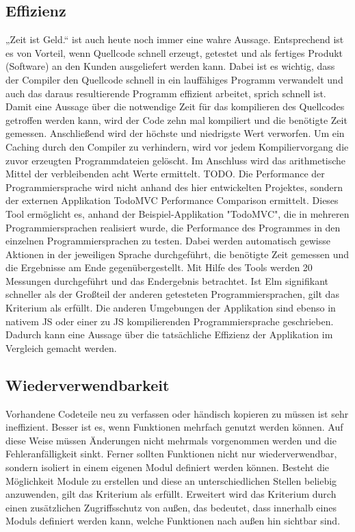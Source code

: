 \subsection{Effizienz}
\label{sec:Effizienz}
„Zeit ist Geld.“ ist auch heute noch immer eine wahre Aussage. Entsprechend ist es von Vorteil, wenn Quellcode schnell erzeugt, getestet und als fertiges Produkt (Software) an den Kunden ausgeliefert werden kann. Dabei ist es wichtig, dass der Compiler den Quellcode schnell in ein lauffähiges Programm verwandelt und auch das daraus resultierende Programm effizient arbeitet, sprich schnell ist. Damit eine Aussage über die notwendige Zeit für das kompilieren des Quellcodes getroffen werden kann, wird der Code zehn mal kompiliert und die benötigte Zeit gemessen. Anschließend wird der höchste und niedrigste Wert verworfen. Um ein Caching durch den Compiler zu verhindern, wird vor jedem Kompiliervorgang die zuvor erzeugten Programmdateien gelöscht. Im Anschluss wird das arithmetische Mittel der verbleibenden acht Werte ermittelt. TODO.
Die Performance der Programmiersprache wird nicht anhand des hier entwickelten Projektes, sondern der externen Applikation \cite{https://github.com/evancz/todomvc-perf-comparison/} TodoMVC Performance Comparison ermittelt. Dieses Tool ermöglicht es, anhand der Beispiel-Applikation "TodoMVC", die in mehreren Programmiersprachen realisiert wurde, die Performance des Programmes in den einzelnen Programmiersprachen zu testen. Dabei werden automatisch gewisse Aktionen in der jeweiligen Sprache durchgeführt, die benötigte Zeit gemessen und die Ergebnisse am Ende gegenübergestellt. Mit Hilfe des Tools werden 20 Messungen durchgeführt und das Endergebnis betrachtet. Ist Elm signifikant schneller als der Großteil der anderen getesteten Programmiersprachen, gilt das Kriterium als erfüllt. Die anderen Umgebungen der Applikation sind ebenso in nativem \ac{JS} oder einer zu \ac{JS} kompilierenden Programmiersprache geschrieben. Dadurch kann eine Aussage über die tatsächliche Effizienz der Applikation im Vergleich gemacht werden.


\subsection{Wiederverwendbarkeit}
\label{sec:Wiederverwendbarkeit}
Vorhandene Codeteile neu zu verfassen oder händisch kopieren zu müssen ist sehr ineffizient. Besser ist es, wenn Funktionen mehrfach genutzt werden können. Auf diese Weise müssen Änderungen nicht mehrmals vorgenommen werden und die Fehleranfälligkeit sinkt. Ferner sollten Funktionen nicht nur wiederverwendbar, sondern isoliert in einem eigenen Modul definiert werden können. Besteht die Möglichkeit Module zu erstellen und diese an unterschiedlichen Stellen beliebig anzuwenden, gilt das Kriterium als erfüllt. Erweitert wird das Kriterium durch einen zusätzlichen Zugriffsschutz von außen, das bedeutet, dass innerhalb eines Moduls definiert werden kann, welche Funktionen nach außen hin sichtbar sind.


